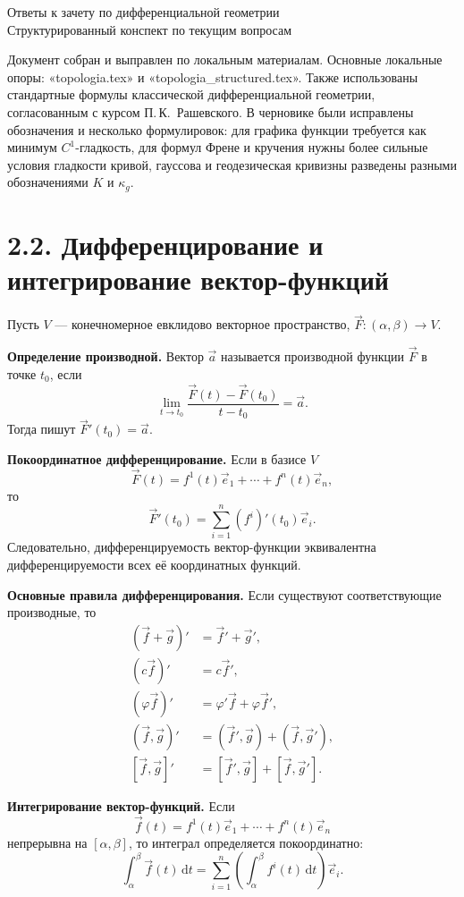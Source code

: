 \documentclass[12pt,a4paper]{article}
\newcommand{\dd}{\,\mathrm{d}}
\begin{document}
\begin{center}
{\LARGE Ответы к зачету по дифференциальной геометрии}\\[0.5em]
{\large Структурированный конспект по текущим вопросам}
\end{center}

Документ собран и выправлен по локальным материалам.
Основные локальные опоры: «topologia.tex» и
«topologia\_structured.tex».
Также использованы стандартные формулы классической дифференциальной геометрии,
согласованным с курсом П.\,К.~Рашевского. В черновике были исправлены
обозначения и несколько формулировок: для графика функции требуется
как минимум $C^1$-гладкость, для формул Френе и кручения нужны более
сильные условия гладкости кривой, гауссова и геодезическая кривизны
разведены разными обозначениями $K$ и $\kappa_g$.

\tableofcontents
\newpage

\section{2.2. Дифференцирование и интегрирование вектор-функций}

Пусть $V$ --- конечномерное евклидово векторное пространство,
$\vec{F} : (\alpha,\beta)\to V$.

\textbf{Определение производной.}
Вектор $\vec{a}$ называется производной функции $\vec{F}$ в точке $t_0$, если
\[
\lim_{t\to t_0}\frac{\vec{F}(t)-\vec{F}(t_0)}{t-t_0}=\vec{a}.
\]
Тогда пишут $\vec{F}'(t_0)=\vec{a}$.

\textbf{Покоординатное дифференцирование.}
Если в базисе $V$
\[
\vec{F}(t)=f^1(t)\vec{e}_1+\cdots+f^n(t)\vec{e}_n,
\]
то
\[
\vec{F}'(t_0)=\sum_{i=1}^n (f^i)'(t_0)\vec{e}_i.
\]
Следовательно, дифференцируемость вектор-функции эквивалентна
дифференцируемости всех её координатных функций.

\textbf{Основные правила дифференцирования.}
Если существуют соответствующие производные, то
\begin{align*}
(\vec{f}+\vec{g})' &= \vec{f}'+\vec{g}',\\
(c\vec{f})' &= c\vec{f}',\\
(\varphi \vec{f})' &= \varphi'\vec{f}+\varphi \vec{f}',\\
(\vec{f},\vec{g})' &= (\vec{f}',\vec{g})+(\vec{f},\vec{g}'),\\
[\vec{f},\vec{g}]' &= [\vec{f}',\vec{g}]+[\vec{f},\vec{g}'].
\end{align*}

\textbf{Интегрирование вектор-функций.}
Если
\[
\vec{f}(t)=f^1(t)\vec{e}_1+\cdots+f^n(t)\vec{e}_n
\]
непрерывна на $[\alpha,\beta]$, то интеграл определяется покоординатно:
\[
\int_\alpha^\beta \vec{f}(t)\dd t
=
\sum_{i=1}^n \left(\int_\alpha^\beta f^i(t)\dd t\right)\vec{e}_i.
\]
\end{document}
